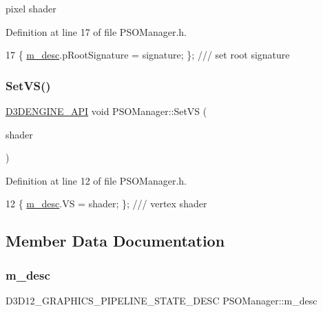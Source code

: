 pixel shader 



Definition at line 17 of file P\+S\+O\+Manager.\+h.


\begin{DoxyCode}
17 \{ \mbox{\hyperlink{class_p_s_o_manager_ac5a7e346b2d641709d7146f5a0f45dee}{m\_desc}}.pRootSignature = signature; \}; \textcolor{comment}{/// set root signature}
\end{DoxyCode}
\mbox{\label{class_p_s_o_manager_a15d9aa9d5491c74d6d79300a560907c9}} 
\subsubsection{\texorpdfstring{Set\+V\+S()}{SetVS()}}
{\footnotesize\ttfamily \mbox{\hyperlink{stdafx_8h_a8ee2d990c5dfba7794dd2b60741d7722}{D3\+D\+E\+N\+G\+I\+N\+E\+\_\+\+A\+PI}} void P\+S\+O\+Manager\+::\+Set\+VS (\begin{DoxyParamCaption}\item[{const C\+D3\+D\+X12\+\_\+\+S\+H\+A\+D\+E\+R\+\_\+\+B\+Y\+T\+E\+C\+O\+DE}]{shader }\end{DoxyParamCaption})\hspace{0.3cm}{\ttfamily [inline]}}



Definition at line 12 of file P\+S\+O\+Manager.\+h.


\begin{DoxyCode}
12 \{ \mbox{\hyperlink{class_p_s_o_manager_ac5a7e346b2d641709d7146f5a0f45dee}{m\_desc}}.VS = shader; \}; \textcolor{comment}{/// vertex shader}
\end{DoxyCode}


\subsection{Member Data Documentation}
\mbox{\label{class_p_s_o_manager_ac5a7e346b2d641709d7146f5a0f45dee}} 
\subsubsection{\texorpdfstring{m\+\_\+desc}{m\_desc}}
{\footnotesize\ttfamily D3\+D12\+\_\+\+G\+R\+A\+P\+H\+I\+C\+S\+\_\+\+P\+I\+P\+E\+L\+I\+N\+E\+\_\+\+S\+T\+A\+T\+E\+\_\+\+D\+E\+SC P\+S\+O\+Manager\+::m\+\_\+desc\hspace{0.3cm}{\ttfamily [private]}}



